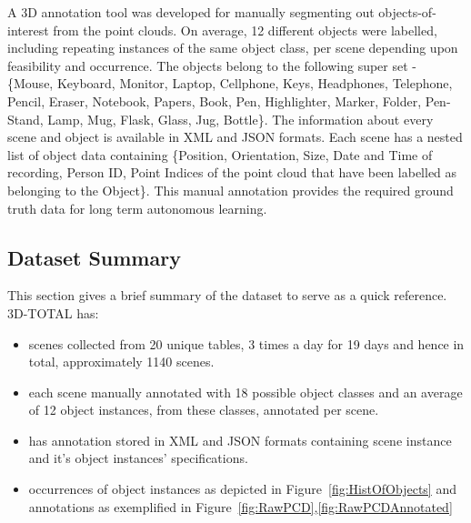 \documentclass[letterpaper, 10 pt, conference]{ieeeconf}  %
\begin{document}
A 3D annotation tool was developed for manually segmenting out objects-of-interest from the point clouds. On average, 12 different objects were labelled, including repeating instances of the same object class, per scene depending upon feasibility and occurrence. The objects belong to the following super set - \{Mouse, Keyboard, Monitor, Laptop, Cellphone, Keys, Headphones, Telephone, Pencil, Eraser, Notebook, Papers,  Book, Pen, Highlighter, Marker, Folder, Pen-Stand, Lamp, Mug, Flask, Glass, Jug, Bottle\}. The information about every scene and object is available in  XML and JSON formats. Each scene has a nested list of object data containing \{Position, Orientation, Size, Date and Time of recording, Person ID, Point Indices of the point cloud that have been labelled as belonging to the Object\}. This manual annotation provides the required ground truth data for long term autonomous learning.

\subsection{Dataset Summary}
\label{ssec:Dataset Summary}
This section gives a brief summary of the dataset to serve as a quick reference.
\noindent 3D-TOTAL has:
\begin{itemize}
	\item scenes collected from 20 unique tables, 3 times a day for 19 days and hence in total, approximately 1140 scenes.
	\item each scene manually annotated with 18 possible object classes and an average of 12 object instances, from these classes, annotated per scene.
	\item has annotation stored in XML and JSON formats containing scene instance and it's object instances' specifications.
	\item occurrences of object instances as depicted in Figure~\ref{fig:HistOfObjects} and annotations as exemplified in Figure~\ref{fig:RawPCD},\ref{fig:RawPCDAnnotated}
\end{itemize}
\end{document}
